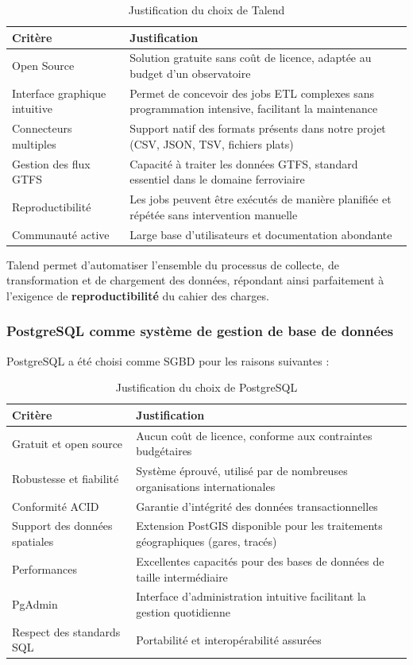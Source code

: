 \documentclass[12pt,a4paper]{article}
\begin{document}
\begin{table}[h!]
\centering
\begin{tabular}{|p{4cm}|p{10cm}|}
\hline
\textbf{Critère} & \textbf{Justification} \\
\hline
Open Source & Solution gratuite sans coût de licence, adaptée au budget d'un observatoire \\
\hline
Interface graphique intuitive & Permet de concevoir des jobs ETL complexes sans programmation intensive, facilitant la maintenance \\
\hline
Connecteurs multiples & Support natif des formats présents dans notre projet (CSV, JSON, TSV, fichiers plats) \\
\hline
Gestion des flux GTFS & Capacité à traiter les données GTFS, standard essentiel dans le domaine ferroviaire \\
\hline
Reproductibilité & Les jobs peuvent être exécutés de manière planifiée et répétée sans intervention manuelle \\
\hline
Communauté active & Large base d'utilisateurs et documentation abondante \\
\hline
\end{tabular}
\caption{Justification du choix de Talend}
\end{table}

Talend permet d'automatiser l'ensemble du processus de collecte, de transformation et de chargement des données, répondant ainsi parfaitement à l'exigence de \textbf{reproductibilité} du cahier des charges.

\subsubsection{PostgreSQL comme système de gestion de base de données}

PostgreSQL a été choisi comme SGBD pour les raisons suivantes :

\begin{table}[h!]
\centering
\begin{tabular}{|p{4cm}|p{10cm}|}
\hline
\textbf{Critère} & \textbf{Justification} \\
\hline
Gratuit et open source & Aucun coût de licence, conforme aux contraintes budgétaires \\
\hline
Robustesse et fiabilité & Système éprouvé, utilisé par de nombreuses organisations internationales \\
\hline
Conformité ACID & Garantie d'intégrité des données transactionnelles \\
\hline
Support des données spatiales & Extension PostGIS disponible pour les traitements géographiques (gares, tracés) \\
\hline
Performances & Excellentes capacités pour des bases de données de taille intermédiaire \\
\hline
PgAdmin & Interface d'administration intuitive facilitant la gestion quotidienne \\
\hline
Respect des standards SQL & Portabilité et interopérabilité assurées \\
\hline
\end{tabular}
\caption{Justification du choix de PostgreSQL}
\end{table}
\end{document}
